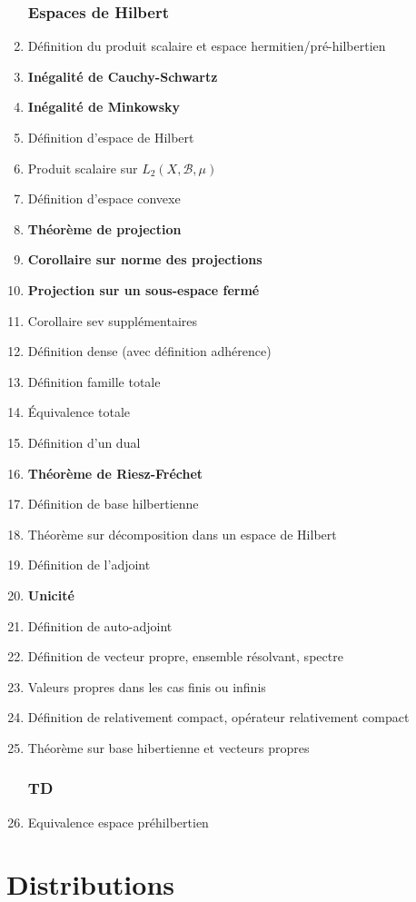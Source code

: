 \documentclass{article}
\begin{document}
\begin{enumerate}
\section{Espaces de Hilbert}
	\item Définition du produit scalaire et espace hermitien/pré-hilbertien
	\item \textbf{Inégalité de Cauchy-Schwartz}
	\item \textbf{Inégalité de Minkowsky}
	\item Définition d'espace de Hilbert
	\item Produit scalaire sur $L_2(X,\mathcal{B},\mu)$
	\item Définition d'espace convexe
	\item \textbf{Théorème de projection}
	\item \textbf{Corollaire sur norme des projections}
	\item \textbf{Projection sur un sous-espace fermé}
	\item Corollaire sev supplémentaires
	\item Définition dense (avec définition adhérence)
	\item Définition famille totale
	\item Équivalence totale
	\item Définition d'un dual
	\item \textbf{Théorème de Riesz-Fréchet}
	\item Définition de base hilbertienne
	\item Théorème sur décomposition dans un espace de Hilbert
	\item Définition de l'adjoint
	\item \textbf{Unicité}
	\item Définition de auto-adjoint
	\item Définition de vecteur propre, ensemble résolvant, spectre
	\item Valeurs propres dans les cas finis ou infinis
	\item Définition de relativement compact, opérateur relativement compact
	\item Théorème sur base hibertienne et vecteurs propres
\section{TD}
	\item Equivalence espace préhilbertien
\end{enumerate}

\newpage
\part{Distributions}
\end{document}
